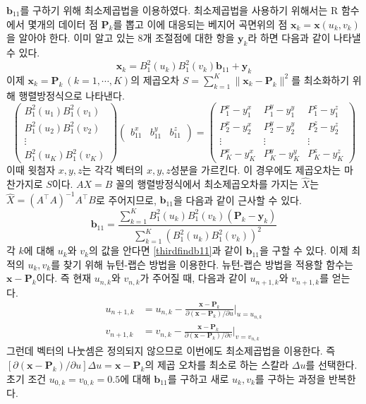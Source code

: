 \documentclass{gshs_thesis}
\theoremstyle{theorem}
\theoremstyle{lemma}
\theoremstyle{definition}
\begin{document}
$\textbf{b}_{11}$를 구하기 위해 최소제곱법을 이용하였다. 최소제곱법을 사용하기 위해서는 R 함수에서  몇개의 데이터 점 $\textbf{P}_{k}$를 뽑고 이에 대응되는 베지어 곡면위의 점 $\mathbf{x}_k=\mathbf{x}(u_k, v_k)$을 알아야 한다. 이미 알고 있는 8개 조절점에 대한 항을 $\mathbf{y}_k$라 하면 다음과 같이 나타낼 수 있다. 
\begin{equation*}
	\mathbf{x}_k=B_1^2(u_k)B_1^2(v_k)\mathbf{b}_{11}+\mathbf{y}_k
\end{equation*}
이제 $\mathbf{x}_k=\mathbf{P}_k\ (k=1, \cdots, K)$의 제곱오차 $S=\sum_{k=1}^K \| \mathbf{x}_k-\mathbf{P}_k \|^2$를 최소화하기 위해 행렬방정식으로 나타낸다.
\begin{equation*}
	\begin{pmatrix}
		B_1^2(u_1)B_1^2(v_1) \\ B_1^2(u_2)B_1^2(v_2) \\ \vdots \\ B_1^2(u_K)B_1^2(v_K)
	\end{pmatrix} \begin{pmatrix}
		b_{11}^x & b_{11}^y & b_{11}^z
	\end{pmatrix} = \begin{pmatrix}
		P_1^x-y_1^x & P_1^y-y_1^y & P_1^z-y_1^z \\ P_2^x-y_2^x & P_2^y-y_2^y & P_2^z-y_2^z \\ \vdots & \vdots & \vdots \\ P_K^x-y_K^x & P_K^y-y_K^y & P_K^z-y_K^z
	\end{pmatrix}
\end{equation*}
이때 윗첨자 $x, y, z$는 각각 벡터의 $x, y, z$성분을 가르킨다. 이 경우에도 제곱오차는 마찬가지로 $S$이다. $AX=B$ 꼴의 행렬방정식에서 최소제곱오차를 가지는 $\hat{X}$는 $\hat{X}=(A^\intercal A)^{-1}A^\intercal B$로 주어지므로, $\mathbf{b}_{11}$을 다음과 같이 근사할 수 있다. 
\begin{equation} \label{thirdfindb11}
	\mathbf{b}_{11}=\dfrac{\sum_{k=1}^K B_1^2(u_k)B_1^2(v_k)(\mathbf{P}_k-\mathbf{y}_k)}{\sum_{k=1}^K (B_1^2(u_k)B_1^2(v_k))^2}
\end{equation}
각 $k$에 대해 $u_k$와 $v_k$의 값을 안다면 \eqref{thirdfindb11}과 같이 $\mathbf{b}_{11}$을 구할 수 있다. 이제 최적의 $u_k, v_k$를 찾기 위해 뉴턴-랩슨 방법을 이용한다. 뉴턴-랩슨 방법을 적용할 함수는 $\mathbf{x}-\mathbf{P}_k$이다. 즉 현재 $u_{n, k}$와 $v_{n, k}$가 주어질 때, 다음과 같이 $u_{n+1, k}$와 $v_{n+1, k}$를 얻는다. 
\begin{align}
	u_{n+1, k}&=u_{n, k}-\frac{\mathbf{x}-\mathbf{P}_k}{\partial(\mathbf{x}-\mathbf{P}_k)/\partial u} \bigg|_{u=u_{n, k}} \\
	v_{n+1, k}&=v_{n, k}-\frac{\mathbf{x}-\mathbf{P}_k}{\partial(\mathbf{x}-\mathbf{P}_k)/\partial v} \bigg|_{v=v_{n, k}}
\end{align}
그런데 벡터의 나눗셈은 정의되지 않으므로 이번에도 최소제곱법을 이용한다. 즉 $[\partial(\mathbf{x}-\mathbf{P}_k)/\partial u] \Delta u = \mathbf{x}-\mathbf{P}_k$의 제곱 오차를 최소로 하는 스칼라 $\Delta u$를 선택한다.  초기 조건 $u_{0, k}=v_{0, k}=0.5$에 대해 $\mathbf{b}_{11}$를 구하고 새로 $u_k, v_k$를 구하는 과정을 반복한다. 
\end{document}

